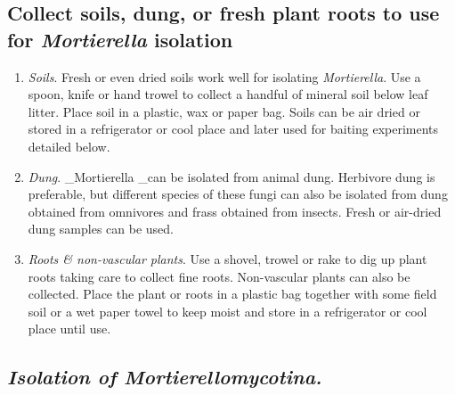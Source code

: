 \documentclass[]{book}
\providecommand{\tightlist}{%
  \setlength{\itemsep}{0pt}\setlength{\parskip}{0pt}}
\begin{document}
\hypertarget{collect-soils-dung-or-fresh-plant-roots-to-use-for-mortierella-isolation}{%
\subsection{\texorpdfstring{Collect soils, dung, or fresh plant roots to use for \emph{Mortierella} isolation}{Collect soils, dung, or fresh plant roots to use for Mortierella isolation}}\label{collect-soils-dung-or-fresh-plant-roots-to-use-for-mortierella-isolation}}

\begin{enumerate}
\def\labelenumi{\arabic{enumi}.}
\tightlist
\item
  \emph{Soils}. Fresh or even dried soils work well for isolating \emph{Mortierella}. Use a spoon, knife or hand trowel to collect a handful of mineral soil below leaf litter. Place soil in a plastic, wax or paper bag. Soils can be air dried or stored in a refrigerator or cool place and later used for baiting experiments detailed below.
\item
  \emph{Dung}. \_Mortierella \_can be isolated from animal dung. Herbivore dung is preferable, but different species of these fungi can also be isolated from dung obtained from omnivores and frass obtained from insects. Fresh or air-dried dung samples can be used.
\item
  \emph{Roots \& non-vascular plants}. Use a shovel, trowel or rake to dig up plant roots taking care to collect fine roots. Non-vascular plants can also be collected. Place the plant or roots in a plastic bag together with some field soil or a wet paper towel to keep moist and store in a refrigerator or cool place until use.
\end{enumerate}

\hypertarget{isolation-of-mortierellomycotina.}{%
\subsection{\texorpdfstring{\emph{Isolation of Mortierellomycotina.}}{Isolation of Mortierellomycotina.}}\label{isolation-of-mortierellomycotina.}}
\end{document}
